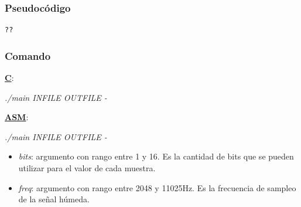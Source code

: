 \subsubsection{Pseudocódigo}
\label{subsec:desarrollo-bitcrusher-code}

\lstset{language=C}
\begin{lstlisting}[frame=single]
??
\end{lstlisting}

\subsubsection{Comando}
\label{subsec:desarrollo-bitcrusher-call}

\underline{\textbf{C}}:
\begin{center}
 \textit{./main INFILE OUTFILE -}
\end{center}

\underline{\textbf{ASM}}:
\begin{center}
 \textit{./main INFILE OUTFILE -}
\end{center}

\begin{itemize}
 \item \textit{bits}: argumento con rango entre 1 y 16. Es la cantidad de bits que se pueden utilizar para el valor de cada muestra.
 \item \textit{freq}: argumento con rango entre 2048 y 11025Hz. Es la frecuencia de sampleo de la señal húmeda.
\end{itemize}
 
 
